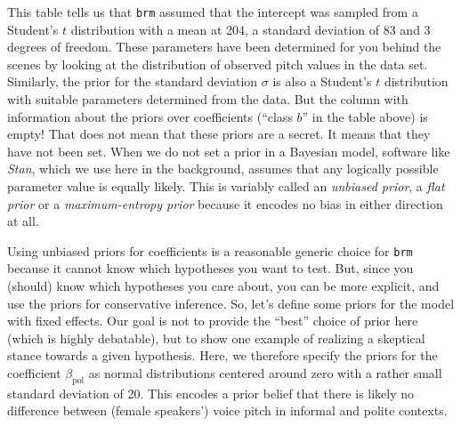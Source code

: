 \documentclass[nobib]{tufte-handout}
\begin{document}
This table tells us that \texttt{brm} assumed that the intercept was sampled from a Student's $t$ distribution with a mean at 204, a standard deviation of 83 and 3 degrees of freedom. These parameters have been determined for you behind the scenes by looking at the distribution of observed pitch values in the data set.
%
%
Similarly, the prior for the standard deviation $\sigma$ is also a Student's $t$ distribution with suitable parameters determined from the data.
But the column with information about the priors over coefficients (``class $b$'' in the table above) is empty!
That does not mean that these priors are a secret.
It means that they have not been set.
When we do not set a prior in a Bayesian model, software like \emph{Stan}, which we use here in the background, assumes that any logically possible parameter value is equally likely.
This is variably called an \textit{unbiased prior}, a \textit{flat prior} or a \textit{maximum-entropy prior} because it encodes no bias in either direction at all.


Using unbiased priors for coefficients is a reasonable generic choice for \texttt{brm} because
it cannot know which hypotheses you want to test. But, since you (should) know which hypotheses
you care about, you can be more explicit, and use the priors for conservative inference. 
%
So,
let's define some priors for the model with fixed effects. Our goal is not to provide the
``best'' choice of prior here (which is highly debatable), but to show one example of realizing
a skeptical stance towards a given hypothesis. Here, we therefore specify the priors for the
coefficient $\beta_{\text{pol}}$ as normal distributions centered around zero with a rather
small standard deviation of 20. This encodes a prior belief that there is likely no difference
between (female speakers') voice pitch in informal and polite contexts.
%
%
\end{document}
